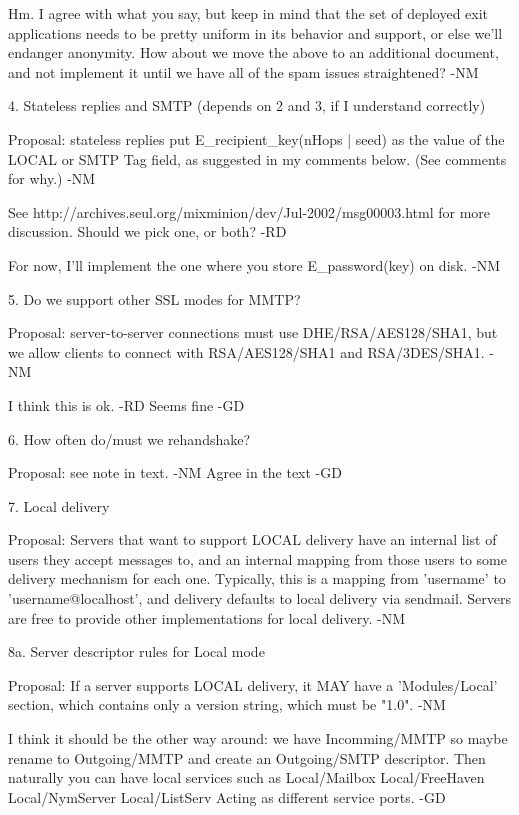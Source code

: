    Hm.  I agree with what you say, but keep in mind that the set of
   deployed exit applications needs to be pretty uniform in its
   behavior and support, or else we'll endanger anonymity.  How about
   we move the above to an additional document, and not implement it
   until we have all of the spam issues straightened?  -NM
   

4. Stateless replies and SMTP (depends on 2 and 3, if I understand correctly)

   Proposal: stateless replies put E_recipient_key(nHops | seed) as
   the value of the LOCAL or SMTP Tag field, as suggested in my
   comments below.  (See comments for why.) -NM

   See http://archives.seul.org/mixminion/dev/Jul-2002/msg00003.html
   for more discussion. Should we pick one, or both? -RD

   For now, I'll implement the one where you store E_password(key) on
   disk. -NM
  
5. Do we support other SSL modes for MMTP?

   Proposal: server-to-server connections must use DHE/RSA/AES128/SHA1, 
   but we allow clients to connect with RSA/AES128/SHA1 and
   RSA/3DES/SHA1.  -NM

   I think this is ok. -RD
   Seems fine -GD
   
6. How often do/must we rehandshake?

   Proposal: see note in text. -NM
             Agree in the text -GD

7. Local delivery

   Proposal: Servers that want to support LOCAL delivery have an
   internal list of users they accept messages to, and an internal
   mapping from those users to some delivery mechanism for each one.
   Typically, this is a mapping from 'username' to
   'username@localhost', and delivery defaults to local delivery via
   sendmail.
       Servers are free to provide other implementations for local 
   delivery. -NM


8a. Server descriptor rules for Local mode

   Proposal: If a server supports LOCAL delivery, it MAY have a
   'Modules/Local' section, which contains only a version string,
   which must be "1.0". -NM

   I think it should be the other way around: 
	we have Incomming/MMTP so maybe rename to Outgoing/MMTP
        and create an Outgoing/SMTP descriptor.
        Then naturally you can have local services such as 
		Local/Mailbox
		Local/FreeHaven
		Local/NymServer
		Local/ListServ
	Acting as different service ports. -GD

